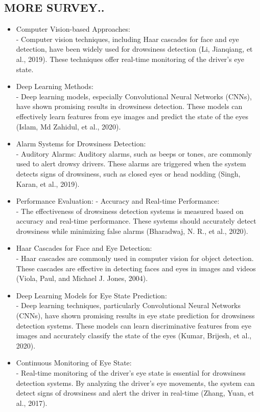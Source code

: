 \documentclass[12pt]{article}
\begin{document}
\subsection{MORE SURVEY..}
\begin{itemize}
\item Computer Vision-based Approaches: \\- Computer vision techniques, including Haar cascades for face and eye detection, have been widely used for drowsiness detection (Li, Jianqiang, et al., 2019). These techniques offer real-time monitoring of the driver's eye state.
\item Deep Learning Methods: \\- Deep learning models, especially Convolutional Neural Networks (CNNs), have shown promising results in drowsiness detection. These models can effectively learn features from eye images and predict the state of the eyes (Islam, Md Zahidul, et al., 2020).
\item Alarm Systems for Drowsiness Detection:\\
- Auditory Alarms: Auditory alarms, such as beeps or tones, are commonly used to alert drowsy drivers. These alarms are triggered when the system detects signs of drowsiness, such as closed eyes or head nodding (Singh, Karan, et al., 2019).
\item Performance Evaluation:
- Accuracy and Real-time Performance: \\- The effectiveness of drowsiness detection systems is measured based on accuracy and real-time performance. These systems should accurately detect drowsiness while minimizing false alarms (Bharadwaj, N. R., et al., 2020).
\item Haar Cascades for Face and Eye Detection: \\- Haar cascades are commonly used in computer vision for object detection. These cascades are effective in detecting faces and eyes in images and videos (Viola, Paul, and Michael J. Jones, 2004).
\item Deep Learning Models for Eye State Prediction:\\- Deep learning techniques, particularly Convolutional Neural Networks (CNNs), have shown promising results in eye state prediction for drowsiness detection systems. These models can learn discriminative features from eye images and accurately classify the state of the eyes (Kumar, Brijesh, et al., 2020).
\item Continuous Monitoring of Eye State: \\- Real-time monitoring of the driver's eye state is essential for drowsiness detection systems. By analyzing the driver's eye movements, the system can detect signs of drowsiness and alert the driver in real-time (Zhang, Yuan, et al., 2017).

\end{itemize}
\end{document}

